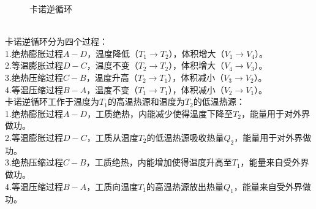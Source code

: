 \documentclass[UTF8]{ctexart}
\begin{document}
\begin{figure}[h]
\begin{center}
            \caption{卡诺逆循环}
        \end{center}
    \end{figure}\\
    卡诺逆循环分为四个过程：\\[3mm]
    1.绝热膨胀过程$A-D$\hspace{0.4pt}，温度降低（$T_1\rightarrow T_2$），体积增大（$V_1\rightarrow V_4$）。\\[3mm]
    2.等温膨胀过程$D-C$，温度不变（$T_2\rightarrow T_2$），体积增大（$V_4\rightarrow V_3$）。\\[3mm]
    3.绝热压缩过程$C-B$，温度升高（$T_2\rightarrow T_1$），体积减小（$V_3\rightarrow V_2$）。\\[3mm]
    4.等温压缩过程$B-A$，温度不变（$T_1\rightarrow T_1$），体积减小（$V_2\rightarrow V_1$）。\\[6mm]
    卡诺逆循环工作于温度为$T_1$的高温热源和温度为$T_2$的低温热源：\\[3mm]
    1.绝热膨胀过程$A-D$，工质绝热，内能减少使得温度下降至$T_2$，能量用于对外界做功。\\[3mm]
    2.等温膨胀过程$D-C$，工质从温度\hspace{4pt}$T_2$\hspace{4pt}的低温热源吸收热量$Q_2$，能量用于对外界做功。\\[3mm]
    3.绝热压缩过程$C-B$\hspace{0.4pt}，工质绝热，内能增加使得温度升高至$T_1$，能量来自受外界做功。\\[3mm]
    4.等温压缩过程$B-A$，工质向温度\hspace{4pt}$T_1$\hspace{4pt}的高温热源放出热量$Q_1$，能量来自受外界做功。
    

\newpage
\end{document}
